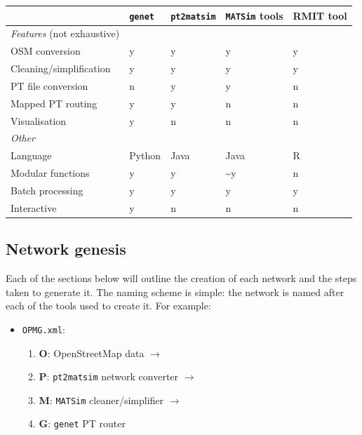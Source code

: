 \documentclass[11pt]{article}
\begin{document}
\begin{center}
\begin{tabular}{lllll}
 & \texttt{genet} & \texttt{pt2matsim} & \texttt{MATSim} tools & RMIT tool\\
\hline
\emph{Features}  (not exhaustive) &  &  &  & \\
\hline
OSM conversion & y & y & y & y\\
Cleaning/simplification & y & y & y & y\\
PT file conversion & n & y & y & n\\
Mapped PT routing & y & y & n & n\\
Visualisation & y & n & n & n\\
\hline
\emph{Other} &  &  &  & \\
\hline
Language & Python & Java & Java & R\\
Modular functions & y & y & \textasciitilde{}y\footnotemark & n\\
Batch processing & y & y & y & y\\
Interactive & y & n & n & n\\
\end{tabular}
\end{center}

\subsection{Network genesis}
\label{sec:org47878f9}
Each of the sections below will outline the creation of each network and the steps taken to generate it. The naming scheme is simple: the network is named after each of the tools used to create it. For example:
\begin{itemize}
\item \texttt{OPMG.xml}:
\begin{enumerate}
\item \textbf{O}: OpenStreetMap data \(\rightarrow\)
\item \textbf{P}: \texttt{pt2matsim} network converter \(\rightarrow\)
\item \textbf{M}: \texttt{MATSim} cleaner/simplifier \(\rightarrow\)
\item \textbf{G}: \texttt{genet} PT router
\end{enumerate}
\end{itemize}
\end{document}
